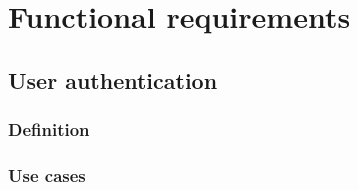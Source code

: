 \section{Functional requirements}

\subsection{User authentication}
\subsubsection{Definition}
\subsubsection{Use cases}




